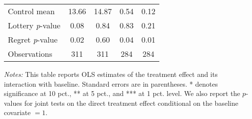 \begin{table}[ht]
{\begin{threeparttable}
\begin{tabular}{l*{4}{c}}
Control mean    &    13.66         &    14.87         &     0.54         &     0.12         \\
Lottery \emph{p}-value&     0.08         &     0.84         &     0.83         &     0.21         \\
Regret \emph{p}-value&     0.02         &     0.60         &     0.04         &     0.01         \\
Observations    &      311         &      311         &      284         &      284         \\
\bottomrule \end{tabular} \begin{tablenotes}[flushleft] \footnotesize \item \emph{Notes:} This table reports OLS estimates of the treatment effect and its interaction with baseline. Standard errors are in parentheses. * denotes significance at 10 pct., ** at 5 pct., and *** at 1 pct. level. We also report the \(p\)-values for joint tests on the direct treatment effect conditional on the baseline covariate $= 1$. \end{tablenotes} \end{threeparttable} } \end{table}

